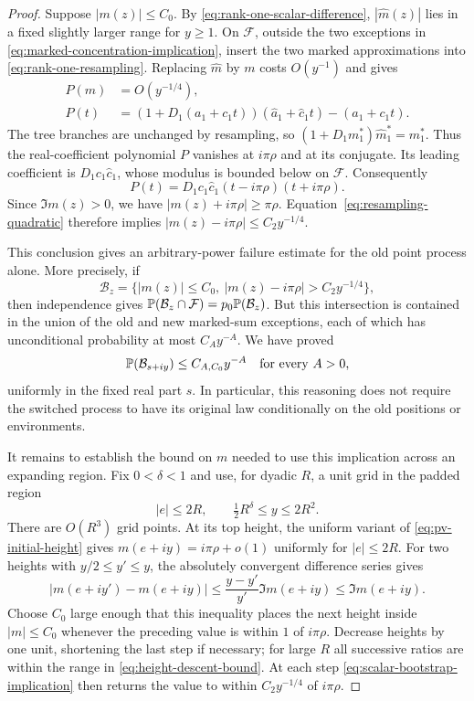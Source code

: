 \begin{proof}
Suppose $|m(z)|\le C_0$. By
\eqref{eq:rank-one-scalar-difference}, $|\widehat m(z)|$ lies in a
fixed slightly larger range for $y\ge1$. On $\mathcal F$, outside
the two exceptions in \eqref{eq:marked-concentration-implication},
insert the two marked approximations into
\eqref{eq:rank-one-resampling}. Replacing $\widehat m$ by $m$ costs
$O(y^{-1})$ and gives
\begin{equation}\label{eq:resampling-quadratic}
 \begin{split}
 P(m)&=O(y^{-1/4}),\\
 P(t)&=(1+D_1(a_1+c_1t))
                      (\widehat a_1+\widehat c_1t)-(a_1+c_1t).
 \end{split}
\end{equation}
The tree branches are unchanged by resampling, so
$(1+D_1m_1^*)\widehat m_1^*=m_1^*$. Thus the real-coefficient
polynomial $P$ vanishes at $i\pi\rho$ and at its conjugate. Its
leading coefficient is $D_1c_1\widehat c_1$, whose modulus is
bounded below on $\mathcal F$. Consequently
\[
 P(t)=D_1c_1\widehat c_1(t-i\pi\rho)(t+i\pi\rho).
\]
Since $\Im m(z)>0$, we have $|m(z)+i\pi\rho|\ge\pi\rho$.
Equation~\eqref{eq:resampling-quadratic} therefore implies
$|m(z)-i\pi\rho|\le C_2 y^{-1/4}$.

This conclusion gives an arbitrary-power failure estimate for the
old point process alone. More precisely, if
\[
 \mathcal B_z=\{|m(z)|\le C_0,
                     \ |m(z)-i\pi\rho|>C_2y^{-1/4}\},
\]
then independence gives
$\mathbb P(\mathcal B_z\cap\mathcal F)=p_0\mathbb P(\mathcal B_z)$.
But this intersection is contained in the union of the old and new
marked-sum exceptions, each of which has unconditional probability
at most $C_Ay^{-A}$. We have proved
\begin{equation}\label{eq:scalar-bootstrap-implication}
 \mathbb P(\mathcal B_{s+iy})\le C_{A,C_0}y^{-A}
 \quad\text{for every }A>0,
\end{equation}
uniformly in the fixed real part $s$. In particular, this reasoning
does not require the switched process to have its original law
conditionally on the old positions or environments.

It remains to establish the bound on $m$ needed to use this
implication across an expanding region. Fix $0<\delta<1$ and use,
for dyadic $R$, a unit grid in the padded region
\[
                |e|\le2R,\qquad \tfrac12R^\delta\le y\le2R^2.
\]
There are $O(R^3)$ grid points. At its top height, the uniform
variant of \eqref{eq:pv-initial-height} gives
$m(e+iy)=i\pi\rho+o(1)$ uniformly for $|e|\le2R$.
For two heights with $y/2\le y'\le y$, the absolutely convergent
difference series gives
\begin{equation}\label{eq:height-descent-bound}
 |m(e+iy')-m(e+iy)|
       \le\frac{y-y'}{y'}\Im m(e+iy)
       \le\Im m(e+iy).
\end{equation}
Choose $C_0$ large enough that this inequality places the next
height inside $|m|\le C_0$ whenever the preceding value is within
$1$ of $i\pi\rho$. Decrease heights by one unit, shortening the
last step if necessary; for large $R$ all successive ratios are
within the range in \eqref{eq:height-descent-bound}. At each step
\eqref{eq:scalar-bootstrap-implication} then returns the value to
within $C_2 y^{-1/4}$ of $i\pi\rho$.


\end{proof}
